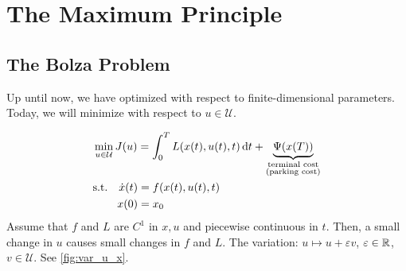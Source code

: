 \chapter{The Maximum Principle}

\section{The Bolza Problem}
Up until now, we have optimized with respect to finite-dimensional parameters. Today, we will minimize with respect to $u\in\mathcal U$.

\begin{align}
  & \min_{u\in\mathcal U} J(u) = \int_0^T L(x(t),u(t),t) \mathop{}\!\mathrm{d} t + \underbrace{\Psi(x(T))}_{\substack{\text{terminal cost}\\ \text{(parking cost)}}} \\
  & \begin{aligned}
    \text{s.t.}\quad \dot x(t) &= f(x(t),u(t),t) \\
    x(0) &= x_0
  \end{aligned}
\end{align}
Assume that $f$ and $L$ are $C^1$ in $x,u$ and piecewise continuous in $t$. Then, a small change in $u$ causes small changes in $f$ and $L$. The variation: $u\longmapsto u+\varepsilon v$, $\varepsilon\in\mathbb{R}$, $v\in\mathcal U$. See \autoref{fig:var_u_x}.
